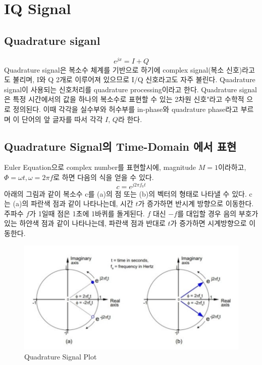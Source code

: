 \section{IQ Signal}
\subsection{Quadrature siganl}
    \begin{equation*}
        e^{jx} = I + Q
    \end{equation*}
    Quadrature signal은  복소수 체계를 기반으로 하기에 complex signal(복소 신호)라고도 불리며, I와 Q 2개로 이루어져 있으므로 I/Q 신호라고도 자주 불린다. Quadrature signal이 사용되는 신호처리를 quadrature processing이라고 한다.
    Quadrature signal은 특정 시간에서의 값을 하나의 복소수로 표현할 수 있는 2차원 신호"라고 수학적 으로 정의된다. 이때 각각을 실수부와 허수부를 in-phase와 quadrature phase라고 부르며 이 단어의 앞 글자를 따서 각각 $I$, $Q$라 한다.
    
\subsection{Quadrature Signal의 Time-Domain 에서 표현}
    Euler Equation으로 complex number를 표현할시에, magnitude $M = 1$이라하고, $\Phi = \omega t, \omega = 2 \pi f$로 하면 다음의 식을 얻을 수 있다. 
    \begin{equation*}
        c = e^{j2\pi f_0 t}
    \end{equation*}
    아래의 그림과 같이 복소수 c를 (a)의 점 또는 (b)의 벡터의 형태로 나타낼 수 있다. c는 (a)의 파란색 점과 같이 나타나는데, 시간 $t$가 증가하면 반시계 방향으로 이동한다. 주파수 $f$가 1일때 점은 1초에 1바퀴를 돌게된다. $f$ 대신 $-f$를 대입할 경우 음의 부호가 있는 하얀색 점과 같이 나타나는데, 파란색 점과 반대로 $t$가 증가하면 시계방향으로 이동한다.
    
    \vspace{-4mm}  
    \begin{figure}[!h]\centering
		\includegraphics[width=.75\textwidth]{image/week02/2-1-1.png}
		\caption{\small Quadrature Signal Plot}
		\vspace{-10pt}
    \end{figure}
    
